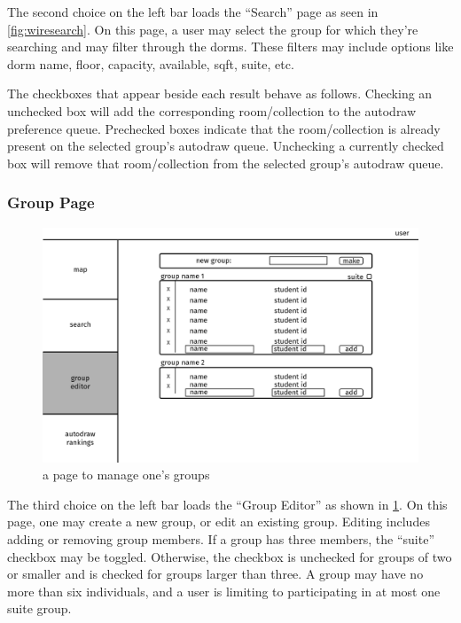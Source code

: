 The second choice on the left bar loads the ``Search'' page as seen in
\cref{fig:wiresearch}. On this page, a user may select the group for which
they're searching and may filter through the dorms. These filters may include
options like dorm name, floor, capacity, available, sqft, suite, etc.

The checkboxes that appear beside each result behave as follows. Checking an
unchecked box will add the corresponding room/collection to the autodraw
preference queue. Prechecked boxes indicate that the room/collection is already
present on the selected group's autodraw queue. Unchecking a currently checked
box will remove that room/collection from the selected group's autodraw queue.


\subsubsection{Group Page}
\begin{figure} \centering
\includegraphics[scale=.15]{wireframe/group}
\caption{a page to manage one's groups}
\label{fig:wiregroup}
\end{figure}

The third choice on the left bar loads the ``Group Editor'' as shown in
\cref{fig:wiregroup}. On this page, one may create a new group, or edit an
existing group. Editing includes adding or removing group members. If a group
has three members, the ``suite'' checkbox may be toggled. Otherwise, the
checkbox is unchecked for groups of two or smaller and is checked for groups
larger than three. A group may have no more than six individuals, and a user is
limiting to participating in at most one suite group.

